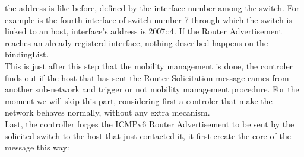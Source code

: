 \documentclass{article}
\begin{document}
the address is like before, defined by the interface number among the
switch. For example is the fourth interface of switch number 7 through
which the switch is linked to an host, interface's address is 2007::4.
If the Router Advertisement reaches an already registerd interface,
nothing described happens on the bindingList.\\
\newline
This is just after this step that the mobility management is done,
the controler finds out if the host that has sent the Router
Solicitation message cames from another sub-network and trigger or
not mobility management procedure. For the moment we will skip this
part, considering first a controler that make the network behaves
normally, without any extra mecanism.\\
\newline
Last, the controller forges the ICMPv6 Router Advertisement to be sent
by the solicited switch to the host that just contacted it, it first
create the core of the message this way: 
\end{document}
